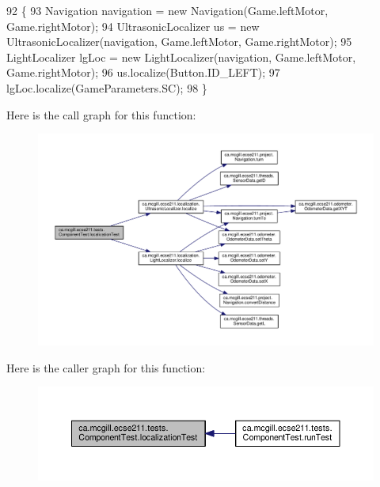 \begin{DoxyCode}
92                                                                   \{
93     Navigation navigation = \textcolor{keyword}{new} Navigation(Game.leftMotor, Game.rightMotor);
94     UltrasonicLocalizer us = \textcolor{keyword}{new} UltrasonicLocalizer(navigation, Game.leftMotor, Game.rightMotor);
95     LightLocalizer lgLoc = \textcolor{keyword}{new} LightLocalizer(navigation, Game.leftMotor, Game.rightMotor);
96     us.localize(Button.ID\_LEFT);
97     lgLoc.localize(GameParameters.SC);
98   \}
\end{DoxyCode}
Here is the call graph for this function\+:\nopagebreak
\begin{figure}[H]
\begin{center}
\leavevmode
\includegraphics[width=350pt]{enumca_1_1mcgill_1_1ecse211_1_1tests_1_1_component_test_ad11712dd74c5c64e84cd71186a59a087_cgraph}
\end{center}
\end{figure}
Here is the caller graph for this function\+:\nopagebreak
\begin{figure}[H]
\begin{center}
\leavevmode
\includegraphics[width=350pt]{enumca_1_1mcgill_1_1ecse211_1_1tests_1_1_component_test_ad11712dd74c5c64e84cd71186a59a087_icgraph}
\end{center}
\end{figure}
\mbox{\label{enumca_1_1mcgill_1_1ecse211_1_1tests_1_1_component_test_aa40592bb550b3526402faddbc0d890c7}} 
